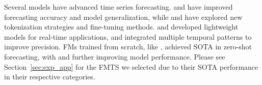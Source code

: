 Several models have advanced time series forecasting. \cite{ansari2024chronos} and \cite{woo2024unified} have improved forecasting accuracy and model generalization, while
\cite{rasul2023lag} and \cite{das2023decoder} have explored new tokenization strategies and fine-tuning methods. \cite{garza2023timegpt} and \cite{ekambaram2024tiny} developed lightweight models for real-time applications, and \cite{talukder2024totem} integrated multiple temporal patterns to improve precision. FMs trained from scratch, like \cite{gruver2024large}, achieved SOTA in zero-shot forecasting, with \cite{cao2023tempo} and \cite{goswami2024moment} further improving model performance. 
Please see Section~\ref{sec:exp_app} for the FMTS we selected due to their SOTA performance in their respective categories.

